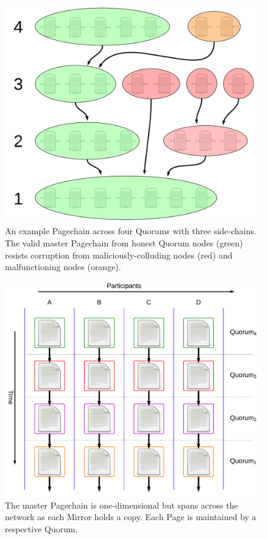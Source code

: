 \documentclass{sig-alternate}
\begin{document}
\begin{figure}[h]
	\centering
	\includegraphics[width=0.87\linewidth]{../images/LucidCharts/Page-chain2.pdf}
	\caption{An example Pagechain across four Quorums with three side-chains. The valid master Pagechain from honest Quorum nodes (green) resists corruption from maliciously-colluding nodes (red) and malfunctioning nodes (orange).}
	\label{fig:sideChains}
\end{figure}

\begin{figure}[h!]
	\centering
	\includegraphics[width=\linewidth]{../images/LucidCharts/Data-Structure-Overview.pdf}
	\caption{The master Pagechain is one-dimensional but spans across the network as each Mirror holds a copy. Each Page is maintained by a respective Quorum.}
\end{figure}
\end{document}
